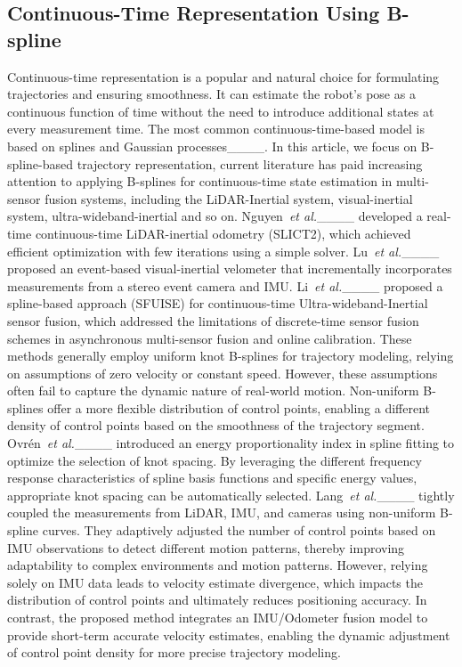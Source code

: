 \subsection{Continuous-Time Representation Using B-spline}
Continuous-time representation is a popular and natural choice for formulating trajectories and ensuring smoothness. 
It can estimate the robot's pose as a continuous function of time without the need to introduce additional states at every measurement time. The most common continuous-time-based model is based on splines and Gaussian processes____. 
In this article, we focus on B-spline-based trajectory representation,  current literature has paid increasing attention to applying B-splines for continuous-time state estimation in multi-sensor fusion systems, including the LiDAR-Inertial system, visual-inertial system, ultra-wideband-inertial and so on.
Nguyen~\textit{et al.}____ developed a real-time continuous-time LiDAR-inertial odometry (SLICT2), which achieved efficient optimization with few iterations using a simple solver.
Lu~\textit{et al.}____ proposed an event-based visual-inertial velometer that incrementally incorporates measurements from a stereo event camera and IMU. 
Li~\textit{et al.}____ proposed a spline-based approach (SFUISE) for continuous-time Ultra-wideband-Inertial sensor fusion, which addressed the limitations of discrete-time sensor fusion schemes in asynchronous multi-sensor fusion and online calibration. 
These methods generally employ uniform knot B-splines for trajectory modeling, relying on assumptions of zero velocity or constant speed. However, these assumptions often fail to capture the dynamic nature of real-world motion. Non-uniform B-splines offer a more flexible distribution of control points, enabling a different density of control points based on the smoothness of the trajectory segment. 
Ovrén~\textit{et al.}____ introduced an energy proportionality index in spline fitting to optimize the selection of knot spacing. 
By leveraging the different frequency response characteristics of spline basis functions and specific energy values, appropriate knot spacing can be automatically selected. 
Lang~\textit{et al.}____ tightly coupled the measurements from LiDAR, IMU, and cameras using non-uniform B-spline curves. 
They adaptively adjusted the number of control points based on IMU observations to detect different motion patterns, thereby improving adaptability to complex environments and motion patterns. However, relying solely on IMU data leads to velocity estimate divergence, which impacts the distribution of control points and ultimately reduces positioning accuracy. 
In contrast, the proposed method integrates an IMU/Odometer fusion model to provide short-term accurate velocity estimates, enabling the dynamic adjustment of control point density for more precise trajectory modeling. 

